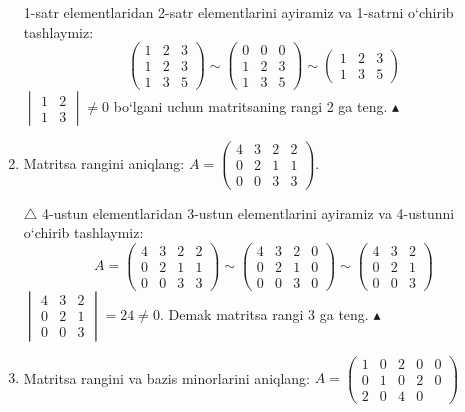 \begin{enumerate}
1-satr elementlaridan 2-satr elementlarini ayiramiz va 1-satrni o`chirib tashlaymiz:
$$\begin{pmatrix}
	1&2&3\\1&2&3\\1&3&5
\end{pmatrix}\sim\begin{pmatrix}
0&0&0\\1&2&3\\1&3&5
\end{pmatrix}\sim\begin{pmatrix}
1&2&3\\1&3&5
\end{pmatrix}$$
$\begin{vmatrix}
	1&2\\1&3
\end{vmatrix}\ne0$ bo`lgani uchun  matritsaning rangi 2 ga teng. $\blacktriangle$

\item Matritsa rangini aniqlang: $A=\begin{pmatrix}
	4&3&2&2\\0&2&1&1\\0&0&3&3
\end{pmatrix}$.

$\triangle$ 4-ustun elementlaridan 3-ustun elementlarini ayiramiz va 4-ustunni o`chirib tashlaymiz:
$$A=\begin{pmatrix}
	4&3&2&2\\0&2&1&1\\0&0&3&3
\end{pmatrix}\sim\begin{pmatrix}
4&3&2&0\\0&2&1&0\\0&0&3&0
\end{pmatrix}\sim\begin{pmatrix}
4&3&2\\0&2&1\\0&0&3
\end{pmatrix}$$
 $\begin{vmatrix}
	4&3&2\\0&2&1\\0&0&3
\end{vmatrix}=24\ne0$. Demak matritsa rangi 3 ga teng. $\blacktriangle$

\item Matritsa rangini  va bazis minorlarini aniqlang:
$A=\begin{pmatrix}
	1&0&2&0&0\\0&1&0&2&0\\2&0&4&0&
\end{pmatrix}$


\end{enumerate}
